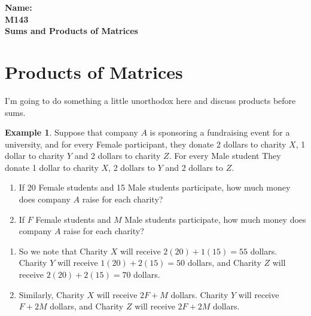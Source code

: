 \documentclass[10pt]{article}
\theoremstyle{definition}
\newtheorem{example}[equation]{Example}
\begin{document}
%

{\bf Name:} \hrulefill\hrulefill\hrulefill\\
{\bf M143} \qquad \qquad \\
{\bf Sums and Products of Matrices }\\ %


\section{Products of Matrices}

I'm going to do something a little unorthodox here and discuss products before sums.

\begin{example}

Suppose that  company $A$ is sponsoring a fundraising event for a university, and for every Female participant, they donate 2 dollars to charity $X$, 1 dollar to charity $Y$ and 2 dollars to charity $Z$.  For every Male student They donate 1 dollar to charity $X$, 2 dollars to $Y$ and 2 dollars to $Z$.

\begin{enumerate}
\item If 20 Female students and 15 Male students participate, how much money does company $A$ raise for each charity?
\item If $F$ Female students and $M$ Male students participate, how much money does company $A$ raise for each charity?
\end{enumerate}


\begin{enumerate}
\item So we note that Charity $X$ will receive $2(20)+1(15)=55$ dollars.  Charity $Y$ will receive $1(20)+2(15)=50$ dollars, and Charity $Z$ will receive $2(20)+2(15)=70$ dollars.

\item Similarly, Charity $X$ will receive $2F+M$ dollars.  Charity $Y$ will receive $F+2M$ dollars, and Charity $Z$ will receive $2F+2M$ dollars.

\end{enumerate}
\end{example}
\end{document}

